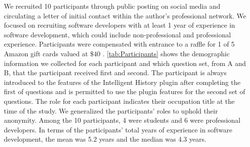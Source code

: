 We recruited 10 participants through public posting on social media and circulating a letter of initial contact within the author's professional network.
We focused on recruiting software developers with at least 1 year of experience in software development, 
which could include non-professional and professional experience.
Participants were compensated with entrance to a raffle for 1 of 5 Amazon gift cards valued at $\$40$ .
\autoref{tab:Participants} shows the demographic information we collected for each participant and 
which question set, from A and B, that the participant received first and second.
The participant is always introduced to the features of the Intelligent History plugin after completing the first of questions and 
is permitted to use the plugin features for the second set of questions.
The role for each participant indicates their occupation title at the time of the study.
We generalized the participants' roles to uphold their anonymity.
Among the 10 participants, 4 were students and 6 were professional developers.
In terms of the participants' total years of experience in software development, 
the mean was 5.2 years and the median was 4.3 years.

